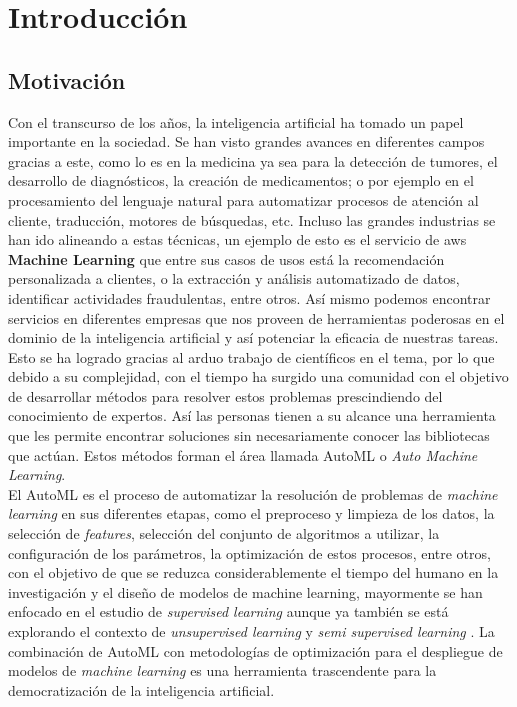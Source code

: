 \chapter*{Introducción}\label{chapter:introduction}

\section*{Motivación}
Con el transcurso de los años, la inteligencia artificial ha tomado un papel importante en la sociedad. Se han visto grandes avances en diferentes campos gracias a este, como lo es en la medicina ya sea para la detección de tumores, el desarrollo de diagnósticos, la creación de medicamentos; o por ejemplo en el procesamiento del lenguaje natural para automatizar procesos de atención al cliente, traducción, motores de búsquedas, etc. Incluso las grandes industrias se han ido alineando a estas técnicas, un ejemplo de esto es el servicio de aws \textbf{Machine Learning} que entre sus casos de usos está la recomendación personalizada a clientes, o la extracción y análisis automatizado de datos, identificar actividades fraudulentas, entre otros. Así mismo podemos encontrar servicios en diferentes empresas que nos proveen de herramientas poderosas en el dominio de la inteligencia artificial y así potenciar la eficacia de nuestras tareas. Esto se ha logrado gracias al arduo trabajo de científicos en el tema, por lo que debido a su complejidad, con el tiempo ha surgido una comunidad con el objetivo de desarrollar métodos para resolver estos problemas prescindiendo del conocimiento de expertos. Así las personas tienen a su alcance una herramienta que les permite encontrar soluciones sin necesariamente conocer las bibliotecas que actúan. Estos métodos forman el área llamada AutoML o \textit{Auto Machine Learning}.\\

El AutoML es el proceso de automatizar la resolución de problemas de \textit{machine learning} en sus diferentes etapas, como el preproceso y limpieza de los datos, la selección de \textit{features}, selección del conjunto de algoritmos a utilizar, la configuración de los parámetros, la optimización de estos procesos, entre otros, con el objetivo de que se reduzca considerablemente el tiempo del humano en la investigación y el diseño de modelos de machine learning, mayormente se han enfocado en el estudio de \textit{supervised learning} aunque ya también se está explorando el contexto de \textit{unsupervised learning} \parencite{1} y \textit{semi supervised learning} \parencite{2}. La combinación de AutoML con metodologías de optimización para el despliegue de modelos de \textit{machine learning} es una herramienta trascendente para la democratización de la inteligencia artificial.\\

